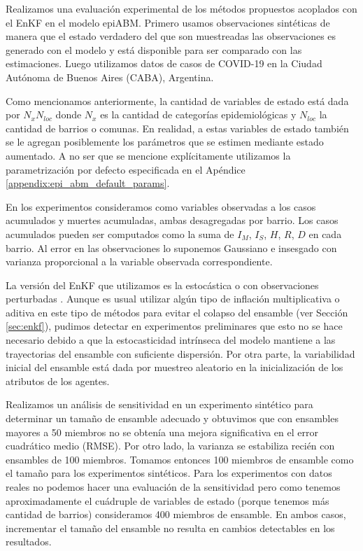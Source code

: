 Realizamos una evaluación experimental de los métodos propuestos acoplados con el EnKF en el modelo epiABM. Primero usamos observaciones sintéticas de manera que el estado verdadero del que son muestreadas las observaciones es generado con el modelo y está disponible para ser comparado con las estimaciones. Luego utilizamos datos de casos de COVID-19 en la Ciudad Autónoma de Buenos Aires (CABA), Argentina. 

Como mencionamos anteriormente, la cantidad de variables de estado está dada por $N_x N_{loc}$ donde $N_x$ es la cantidad de categorías epidemiológicas y $N_{loc}$ la cantidad de barrios o comunas. En realidad, a estas variables de estado también se le agregan posiblemente los parámetros que se estimen mediante estado aumentado. A no ser que se mencione explícitamente utilizamos la parametrización por defecto especificada en el Apéndice \ref{appendix:epi_abm_default_params}.

En los experimentos consideramos como variables observadas a los casos acumulados y muertes acumuladas, ambas desagregadas por barrio. Los casos acumulados pueden ser computados como la suma de $I_M$, $I_S$, $H$, $R$, $D$ en cada barrio. Al error en las observaciones lo suponemos Gaussiano e insesgado con varianza proporcional a la variable observada correspondiente. 

La versión del EnKF que utilizamos es la estocástica o con observaciones perturbadas \citep{Burgers1998}. Aunque es usual utilizar algún tipo de inflación multiplicativa o aditiva en este tipo de métodos para evitar el colapso del ensamble (ver Sección \ref{sec:enkf}), pudimos detectar en experimentos preliminares que esto no se hace necesario debido a que la estocasticidad intrínseca del modelo mantiene a las trayectorias del ensamble con suficiente dispersión. Por otra parte, la variabilidad inicial del ensamble está dada por muestreo aleatorio en la inicialización de los atributos de los agentes.

Realizamos un análisis de sensitividad en un experimento sintético para determinar un tamaño de ensamble adecuado y obtuvimos que con ensambles mayores a 50 miembros no se obtenía una mejora significativa en el error cuadrático medio (RMSE). Por otro lado, la varianza se estabiliza recién con ensambles de 100 miembros. Tomamos entonces 100 miembros de ensamble como el tamaño para los experimentos sintéticos. Para los experimentos con datos reales no podemos hacer una evaluación de la sensitividad pero como tenemos aproximadamente el cuádruple de variables de estado (porque tenemos más cantidad de barrios) consideramos 400 miembros de ensamble. En ambos casos, incrementar el tamaño del ensamble no resulta en cambios detectables en los resultados.

